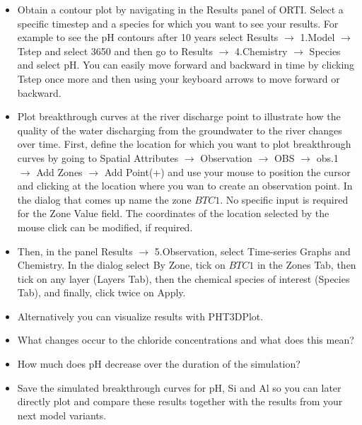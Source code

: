 \begin{itemize}

\item Obtain a contour plot by navigating in the {\color{blue} Results} panel of ORTI.
Select a specific timestep and a species for which you want to see your results.
For example to see the pH contours after 10 years select {\color{blue}Results} $\rightarrow$ {\color{blue}1.Model} 
$\rightarrow$ {\color{blue}Tstep} and select {\color{blue}3650} and then go to   
{\color{blue}Results} $\rightarrow$ {\color{blue}4.Chemistry} 
$\rightarrow$ {\color{blue}Species} and select {\color{blue}pH}.  
You can easily move forward and backward in time by clicking {\color{blue}Tstep} once more and then
using your keyboard arrows to move forward or backward.

\item Plot breakthrough curves at the river discharge point to illustrate how the quality of the
water discharging from the groundwater to the river changes over time.
First, define the location for which you want to plot breakthrough curves by
going to 
{\color{blue}Spatial Attributes} 
$\rightarrow$ {\color{blue}Observation} 
$\rightarrow$ {\color{blue}OBS} 
$\rightarrow$ {\color{blue}obs.1} 
$\rightarrow$ {\color{blue}Add Zones} 
$\rightarrow$ {\color{blue}Add Point(+)}
and use your mouse to position the cursor and clicking at the location
where you wan to create an observation point. 
In the dialog that comes up name the zone $BTC1$. 
No specific input is required for the {\color{blue}Zone Value} field.
The coordinates of the location selected by the mouse click can be modified, if required.

\item Then, in the panel {\color{blue}Results} $\rightarrow$ {\color{blue}5.Observation}, select {\color{blue}Time-series Graphs and Chemistry}. In the dialog select By Zone, tick on $BTC1$ in the {\color{blue}Zones} Tab, then tick on any layer ({\color{blue}Layers} Tab), then the chemical species of interest ({\color{blue}Species} Tab), and finally, click twice on {\color{blue}Apply}.

\item Alternatively you can visualize results with PHT3DPlot. 

\item What changes occur to the chloride concentrations and what does this mean?

\item How much does pH decrease over the duration of the simulation? 

\item Save the simulated breakthrough curves for pH, Si and Al so you can later directly 
plot and compare these results together with the results from your next model variants.  
 
\end{itemize}


